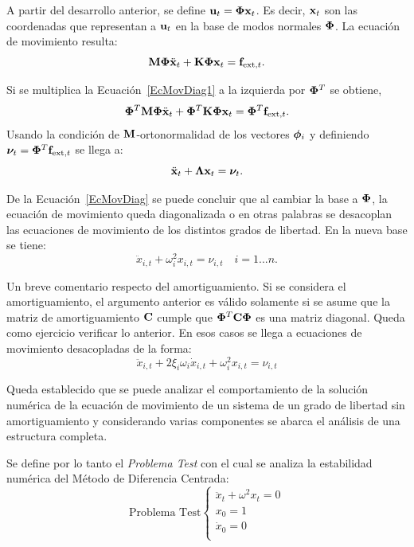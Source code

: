 A partir del desarrollo anterior, se define ${\bf u}_t = \boldsymbol{\Phi} {\bf x}_t$. Es decir, ${\bf x}_t$ son las coordenadas que representan a ${\bf u}_t$ en la base de modos normales $\boldsymbol{\Phi}$. La ecuación de movimiento resulta:
%
\begin{equation}\label{EcMovDiag1}
	{\bf M} \boldsymbol{\Phi} \ddot{{\bf x}}_t + {\bf K} \boldsymbol{\Phi} {\bf x}_t = {\bf f}_{\text{ext},t}.
\end{equation}

Si se multiplica la Ecuación~\eqref{EcMovDiag1} a la izquierda por $\boldsymbol{\Phi}^T$ se obtiene,
%
\begin{equation}\label{EcMovDiag2}
\boldsymbol{\Phi}^T {\bf M} \boldsymbol{\Phi} \ddot{{\bf x}}_t + \boldsymbol{\Phi}^T {\bf K} \boldsymbol{\Phi} {\bf x}_t = \boldsymbol{\Phi}^T {\bf f}_{\text{ext},t}.
\end{equation}
%
Usando la condición de ${\bf M}$-ortonormalidad de los vectores $\boldsymbol{\phi}_i$ y definiendo $\boldsymbol{\nu}_t=\boldsymbol{\Phi}^T {\bf f}_{\text{ext},t}$ se llega a:
%
\begin{equation}\label{EcMovDiag}
\ddot{{\bf x}}_t + \boldsymbol{\Lambda} {\bf x}_t = \boldsymbol{\nu}_t.
\end{equation}

De la Ecuación~\eqref{EcMovDiag} se puede concluir que al cambiar la base a $\boldsymbol{\Phi}$, la ecuación de movimiento queda diagonalizada o en otras palabras se desacoplan las ecuaciones de movimiento de los distintos grados de libertad. En la nueva base se tiene:
%
\begin{equation}
\ddot{x}_{i,t} + \omega^2_i x_{i,t} = \nu_{i,t} \quad  i=1...n.
\end{equation}

Un breve comentario respecto del amortiguamiento. Si se considera el amortiguamiento, el argumento anterior es válido solamente si se asume que la matriz de amortiguamiento ${\bf C}$ cumple que $\boldsymbol{\Phi}^T {\bf C} \boldsymbol{\Phi}$ es una matriz diagonal. %
%
Queda como ejercicio verificar lo anterior. %
%
En esos casos se llega a ecuaciones de movimiento desacopladas de la forma:
%
\begin{equation}\label{EcMovDiagAmor}
\ddot{x}_{i,t} + 2\xi_i\omega_i \dot{x}_{i,t} + \omega^2_i x_{i,t} = \nu_{i,t}
\end{equation}

Queda establecido que se puede analizar el comportamiento de la solución numérica de la ecuación de movimiento de un sistema de un grado de libertad sin amortiguamiento y considerando varias componentes se abarca el análisis de una estructura completa.

Se define por lo tanto el \textit{Problema Test} con el cual se analiza la estabilidad numérica del Método de Diferencia Centrada:
%
\begin{equation}\label{Ptest}
\text{Problema Test}
\begin{cases} 
\ddot{x}_t + \omega^2 x_t = 0\\
x_0 = 1 \\
\dot{x}_0 = 0\\
\end{cases}
\end{equation}

